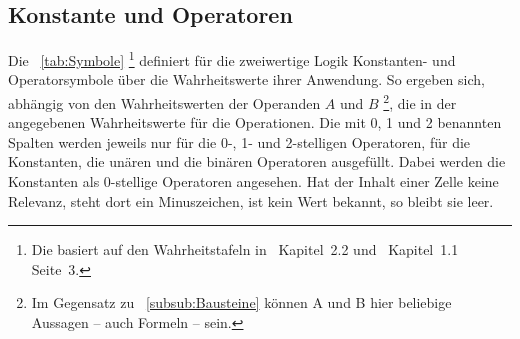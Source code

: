 \subsection{Konstante und Operatoren}%
\label{sub:Operatoren}

Die \tablename~\vref{tab:Symbole}%
\footnote{%
	Die \tablename{} basiert auf den Wahrheitstafeln in~\cite{bib:Junktor} Kapitel~2.2 und~\cite{bib:Rautenberg} Kapitel~1.1 Seite~3.%
}
definiert für die zweiwertige Logik Konstanten- und Operatorsymbole über die Wahrheitswerte ihrer Anwendung.
So ergeben sich, abhängig von den Wahrheitswerten der Operanden $A$ und $B$%
\footnote{%
	Im Gegensatz zu \subsubsectionname~\vref{subsub:Bausteine} können A und B hier beliebige Aussagen -- auch Formeln -- sein.%
},
die in der \tablename{} angegebenen Wahrheitswerte für die Operationen.
Die mit 0, 1 und 2 benannten Spalten werden jeweils nur für die 0-, 1- und 2-stelligen Operatoren, \textdh für die Konstanten, die unären und die binären Operatoren ausgefüllt.
Dabei werden die Konstanten als 0-stellige Operatoren angesehen.
Hat der Inhalt einer Zelle keine Relevanz, steht dort ein Minuszeichen, ist kein Wert bekannt, so bleibt sie leer.

                                        
 \setcounter{pnequiv} {\value{prio}}
  \setcounter{pequiv}  {\value{prio}} 
   \setcounter{pnrep}   {\value{prio}}
    \setcounter{prep}    {\value{prio}}
   \setcounter{pnimp}   {\value{prio}}
    \setcounter{pimp}    {\value{prio}} 
    \setcounter{padd}    {\value{prio}}
    \setcounter{pxor}    {\value{prio}}
    \setcounter{pnor}    {\value{prio}}
     \setcounter{por}     {\value{prio}} 
   \setcounter{pmult}   {\value{prio}}
   \setcounter{pnand}   {\value{prio}}
    \setcounter{pand}    {\value{prio}} 
    \setcounter{pnot}    {\value{prio}}

